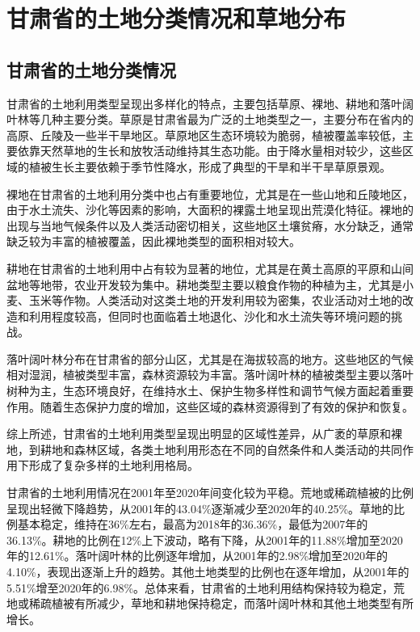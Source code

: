 \documentclass[AutoFakeBold]{LZUThesis-PgD&PhD}
\begin{document}
\section{甘肃省的土地分类情况和草地分布}
\subsection{甘肃省的土地分类情况}
		\par 甘肃省的土地利用类型呈现出多样化的特点，主要包括草原、裸地、耕地和落叶阔叶林等几种主要分类。草原是甘肃省最为广泛的土地类型之一，主要分布在省内的高原、丘陵及一些半干旱地区。草原地区生态环境较为脆弱，植被覆盖率较低，主要依靠天然草地的生长和放牧活动维持其生态功能。由于降水量相对较少，这些区域的植被生长主要依赖于季节性降水，形成了典型的干旱和半干旱草原景观。
		
		裸地在甘肃省的土地利用分类中也占有重要地位，尤其是在一些山地和丘陵地区，由于水土流失、沙化等因素的影响，大面积的裸露土地呈现出荒漠化特征。裸地的出现与当地气候条件以及人类活动密切相关，这些地区土壤贫瘠，水分缺乏，通常缺乏较为丰富的植被覆盖，因此裸地类型的面积相对较大。
		
		耕地在甘肃省的土地利用中占有较为显著的地位，尤其是在黄土高原的平原和山间盆地等地带，农业开发较为集中。耕地类型主要以粮食作物的种植为主，尤其是小麦、玉米等作物。人类活动对这类土地的开发利用较为密集，农业活动对土地的改造和利用程度较高，但同时也面临着土地退化、沙化和水土流失等环境问题的挑战。
		
		落叶阔叶林分布在甘肃省的部分山区，尤其是在海拔较高的地方。这些地区的气候相对湿润，植被类型丰富，森林资源较为丰富。落叶阔叶林的植被类型主要以落叶树种为主，生态环境良好，在维持水土、保护生物多样性和调节气候方面起着重要作用。随着生态保护力度的增加，这些区域的森林资源得到了有效的保护和恢复。
		
	
		综上所述，甘肃省的土地利用类型呈现出明显的区域性差异，从广袤的草原和裸地，到耕地和森林区域，各类土地利用形态在不同的自然条件和人类活动的共同作用下形成了复杂多样的土地利用格局。
		
		
		
		甘肃省的土地利用情况在2001年至2020年间变化较为平稳。荒地或稀疏植被的比例呈现出轻微下降趋势，从2001年的43.04\%逐渐减少至2020年的40.25\%。草地的比例基本稳定，维持在36\%左右，最高为2018年的36.36\%，最低为2007年的36.13\%。耕地的比例在12\%上下波动，略有下降，从2001年的11.88\%增加至2020年的12.61\%。落叶阔叶林的比例逐年增加，从2001年的2.98\%增加至2020年的4.10\%，表现出逐渐上升的趋势。其他土地类型的比例也在逐年增加，从2001年的5.51\%增至2020年的6.98\%。总体来看，甘肃省的土地利用结构保持较为稳定，荒地或稀疏植被有所减少，草地和耕地保持稳定，而落叶阔叶林和其他土地类型有所增长。
		
\end{document}
